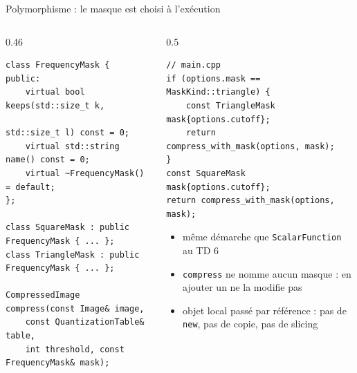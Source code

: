 \documentclass[aspectratio=169,10pt]{beamer}
\newcommand{\code}[1]{\texttt{#1}}
\begin{document}
\begin{frame}[fragile]{Polymorphisme : le masque est choisi à l'exécution}
  \begin{columns}[T]
    \begin{column}{0.46\textwidth}
\begin{lstlisting}
class FrequencyMask {
public:
    virtual bool keeps(std::size_t k,
                       std::size_t l) const = 0;
    virtual std::string name() const = 0;
    virtual ~FrequencyMask() = default;
};

class SquareMask : public FrequencyMask { ... };
class TriangleMask : public FrequencyMask { ... };

CompressedImage compress(const Image& image,
    const QuantizationTable& table,
    int threshold, const FrequencyMask& mask);
\end{lstlisting}
    \end{column}
    \begin{column}{0.5\textwidth}
\begin{lstlisting}
// main.cpp
if (options.mask == MaskKind::triangle) {
    const TriangleMask mask{options.cutoff};
    return compress_with_mask(options, mask);
}
const SquareMask mask{options.cutoff};
return compress_with_mask(options, mask);
\end{lstlisting}
      \begin{itemize}
        \item même démarche que \code{ScalarFunction} au TD 6
        \item \code{compress} ne nomme aucun masque : en ajouter un ne la modifie pas
        \item objet local passé par référence : pas de \code{new}, pas de copie, pas de slicing
      \end{itemize}
    \end{column}
  \end{columns}
\end{frame}
\end{document}
